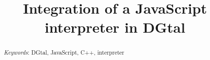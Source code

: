 \documentclass[11pt, english, screen, research-development]{report-rd-info}
\begin{document}
\title{Integration of a JavaScript interpreter in DGtal}

 

\begin{abstract}
\textit{Keywords}: DGtal, JavaScript, C++, interpreter
    \begin{comment}
    
   As the name suggests, the abstract is a very short but informative piece of information about everything you did in this work, i.e., successively the description of the problem at hand, the objectives, the main point of the state-of-the-art, the choices made, the conceptual developments, the conducted experiments, results and interpretations, the new issues.

   It is the last thing to write!
   (Do not provide any details, give popular scientific information.  The introduction and conclusion of the report are there to develop the overall ideas.)
   \end{comment}
\end{abstract}

\begin{classification}
     \begin{comment}
   Bibliographic indexing is required. Use the ACM thesaurus:  See \url{http://www.acm.org/about/class/}. (The following example is based on the 1998 version, where general terms and additional key words are optional.)

   \category{H.2.8}{Database Applications}{Image databases}
   \category{H.3.3}{Information Search and Retrieval}{Clustering, Information filtering, Relevance feedback}
   \category{H.3.7}{Digital Libraries}{User issues}
   \category{I.5.3}{Clustering}{Algorithms, Similarity measures}
   \category{I.4.10}{Image Representation}{Statistical, Multidimensional}
   \terms{Algorithms, Performances, Experiments, Human factors, Verification.}
   \keywords{Content-based image retrieval system, Classification, Feedback loop, Supervised learning.}
   \end{comment}
\end{classification}
\begin{comment}
\begin{acknowledgements}
 
   The usual place of acknowledgements, if this pleases you or if the work has been conducted as part of a larger endeavour.
    
\end{acknowledgements}
\end{comment}
\end{document}

